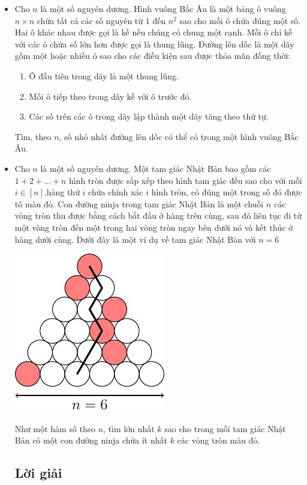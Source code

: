 \documentclass[11pt]{scrartcl}
\begin{document}
\begin{itemize}[label=, leftmargin=0em, itemsep=0.5em]
    \item \begin{btvn} Cho $n$ là một số nguyên dương. Hình vuông Bắc Âu là một bảng ô vuông $n \times n$ chứa tất cả các số nguyên từ $1$ đến $n^2$ sao cho mỗi ô chứa đúng một số. Hai ô khác nhau được gọi là kề nếu chúng có chung một cạnh. Mỗi ô chỉ kề với các ô chứa số lớn hơn được gọi là thung lũng. Đường lên dốc là một dãy gồm một hoặc nhiều ô sao cho các điều kiện sau được thỏa mãn đồng thời:
    \begin{enumerate}
        \item Ô đầu tiên trong dãy là một thung lũng.
        \item Mỗi ô tiếp theo trong dãy kề với ô trước đó.
        \item Các số trên các ô trong dãy lập thành một dãy tăng theo thứ tự.
    \end{enumerate}
    Tìm, theo $n$, số nhỏ nhất đường lên dốc có thể có trong một hình vuông Bắc Âu.
    \end{btvn}
    \item \begin{btvn}
        Cho $n$ là một số nguyên dương. Một tam giác Nhật Bản bao gồm các $1 + 2 + \dots + n$ hình tròn được sắp xếp theo hình tam giác đều sao cho với mỗi $i \in [n]$,hàng thứ $i$ chứa chính xác $i$ hình tròn, có đúng một trong số đó được tô màu đỏ. Con đường ninja trong tam giác Nhật Bản là một chuỗi $n$ các vòng tròn thu được bằng cách bắt đầu ở hàng trên cùng, sau đó liên tục đi từ một vòng tròn đến một trong hai vòng tròn ngay bên dưới nó và kết thúc ở hàng dưới cùng. Dưới đây là một ví dụ về tam giác Nhật Bản với $n = 6$
        \begin{center}
            \includegraphics[scale=1]{Image/IMO2023.pdf}
        \end{center}
  Như một hàm số theo $n$, tìm lớn nhất $k$ sao cho trong mỗi tam giác Nhật Bản có một con đường ninja chứa ít nhất $k$ các vòng tròn màu đỏ.
    \end{btvn}
    \subsection{\LARGE \textcolor{dk}{Lời giải}}

\end{itemize}
\end{document}
